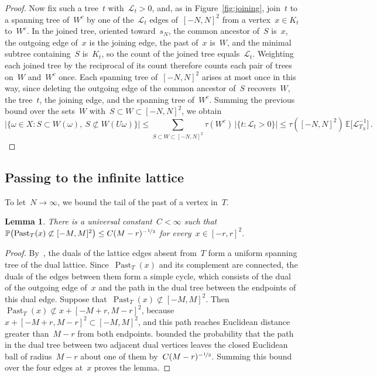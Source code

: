 \documentclass[11pt]{amsart}
\numberwithin{equation}{section}
\newtheorem{lemma}[equation]{Lemma}
\newcommand{\PP}{\mathbb P}
\newcommand{\EE}{\mathbb E}
\newcommand{\nf}{\nicefrac}
\newcommand{\cL}{\mathscr{L}}
\begin{document}
\begin{proof}
Now fix such a tree~$t$ with~$\cL_t>0$, and, as in Figure~\ref{fig:joining}, join~$t$ to a spanning tree of~$W^c$ by one of the~$\cL_t$ edges of~$[-N,N]^2$ from a vertex~$x\in K_t$ to~$W^c$. In the joined tree, oriented toward~$s_N$, the common ancestor of~$S$ is~$x$, the outgoing edge of~$x$ is the joining edge, the past of~$x$ is~$W$, and the minimal subtree containing~$S$ is~$K_t$, so the count of the joined tree equals~$\cL_t$. Weighting each joined tree by the reciprocal of its count therefore counts each pair of trees on~$W$ and~$W^c$ once. Each spanning tree of~$[-N,N]^2$ arises at most once in this way, since deleting the outgoing edge of the common ancestor of~$S$ recovers~$W$, the tree~$t$, the joining edge, and the spanning tree of~$W^c$. Summing the previous bound over the sets~$W$ with~$S\subset W\subset [-N,N]^2$, we obtain
\begin{equation*}
 \bigl|\{\omega\in X:S\subset W(\omega),\ S\not\subset W(U\omega)\}\bigr|\leq\sum_{S\subset W\subset [-N,N]^2}\tau(W^c)\,\bigl|\{t:\cL_t>0\}\bigr|\leq\tau([-N,N]^2)\,\EE\bigl[\cL_{T_N}^{-1}\bigr]\,.
\end{equation*}
\end{proof}

\subsection{Passing to the infinite lattice}\label{sec:limits}

To let~$N\to\infty$, we bound the tail of the past of a vertex in~$T$.

\begin{lemma}\label{rd:past-tail}
There is a universal constant~$C<\infty$ such that~$\PP\bigl(\operatorname{Past}_T(x)\not\subset [-M,M]^2\bigr)\leq C(M-r)^{-\nf13}$ for every~$x\in [-r,r]^2$.
\end{lemma}

\begin{proof}
By~\citet[Proposition~5.6 and Theorem~12.2]{BLPS2001}, the duals of the lattice edges absent from~$T$ form a uniform spanning tree of the dual lattice. Since~$\operatorname{Past}_T(x)$ and its complement are connected, the duals of the edges between them form a simple cycle, which consists of the dual of the outgoing edge of~$x$ and the path in the dual tree between the endpoints of this dual edge. Suppose that~$\operatorname{Past}_T(x)\not\subset [-M,M]^2$. Then~$\operatorname{Past}_T(x)\not\subset x+[-M+r,M-r]^2$, because~$x+[-M+r,M-r]^2\subset [-M,M]^2$, and this path reaches Euclidean distance greater than~$M-r$ from both endpoints. \citet[Lemma~2.6]{BarlowMasson2011} bounded the probability that the path in the dual tree between two adjacent dual vertices leaves the closed Euclidean ball of radius~$M-r$ about one of them by~$C(M-r)^{-\nf13}$. Summing this bound over the four edges at~$x$ proves the lemma.
\end{proof}
\end{document}
